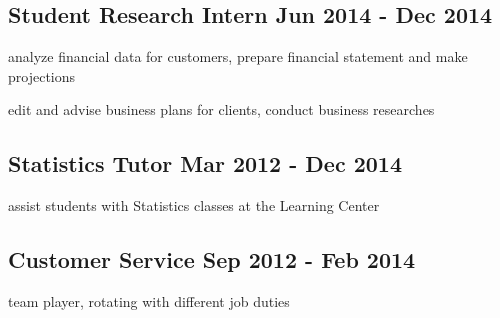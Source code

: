 \documentclass[letter,10pt]{article}
\begin{document}
\subsection{{Student Research Intern \hfill Jun 2014 - Dec 2014}}
\begin{zitemize}
\item analyze financial data for customers, prepare financial statement and make projections
\item edit and advise business plans for clients, conduct business researches
\end{zitemize}

\subsection{{Statistics Tutor \hfill Mar 2012 - Dec 2014}}
\begin{zitemize}
\item assist students with Statistics classes at the Learning Center 
\end{zitemize}

\subsection{{Customer Service  \hfill Sep 2012 - Feb 2014}}
\begin{zitemize}
\item team player, rotating with different job duties
\end{zitemize}

\end{document}
